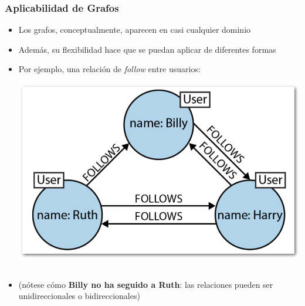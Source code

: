 \documentclass[14pt]{beamer}
\begin{document}
\begin{frame}[allowframebreaks]
  \frametitle{Aplicabilidad de Grafos}
  \begin{itemize}
  \item Los grafos, conceptualmente, aparecen en casi cualquier dominio
  \item Además, su flexibilidad hace que se puedan aplicar de diferentes
    formas
  \item Por ejemplo, una relación de {\em follow\/} entre usuarios:

    \begin{center}
      \includegraphics[width=.4\textwidth]{img/graph1}
    \end{center}
  \end{itemize}

    \begin{columns}
      \begin{column}{.5\textwidth}
        \begin{itemize}
      \item (nótese cómo {\bf Billy no ha seguido a Ruth}: las relaciones
        pueden ser unidireccionales o bidireccionales)


\end{itemize}
\end{column}
\end{columns}
\end{frame}
\end{document}
